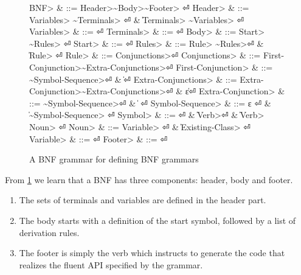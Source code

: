 \begin{figure}
  \begin{Grammar}
    \begin{aligned}
      \<BNF>                & ::= \<Header>\~\<Body>\~\<Footer> \hfill⏎
      \<Header>             & ::= \<Variables> \~\<Terminals> \hfill⏎
      {}                    & \| \<Terminals> \~\<Variables> \hfill⏎
      \<Variables>          & ::= \hfill⏎
      \<Terminals>          & ::= \hfill⏎
      \<Body>               & ::= \<Start> \~\<Rules> \hfill⏎
      \<Start>              & ::=  \hfill⏎
      \<Rules>              & ::= \<Rule> \~\<Rules>\hfill⏎
      {}                    & \| \<Rule> \hfill⏎
      \<Rule>               & ::=  \<Conjunctions>\hfill⏎
      \<Conjunctions>       & ::= \<First-Conjunction>\~\<Extra-Conjunctions>\hfill⏎
      \<First-Conjunction>  & ::= \~\<Symbol-Sequence>\hfill⏎
      {}                    & \| \hfill⏎
      \<Extra-Conjunctions> & ::= \<Extra-Conjunction>\~\<Extra-Conjunctions>\hfill⏎
      {}                    & \| ε\hfill⏎
      \<Extra-Conjunction>  & ::= \~\<Symbol-Sequence>\hfill⏎
      {}                    & \|  \hfill⏎
      \<Symbol-Sequence>    & ::= ε \hfill⏎
      {}                    & \| \~\<Symbol-Sequence> \hfill⏎
      \<Symbol>             & ::=  \hfill⏎
      {}                    & \| \<Verb>\hfill⏎
      {}                    & \| \<Verb>~\cc{,} \<Noun> \hfill⏎
      \<Noun>               & ::= \<Variable> \hfill⏎
      {}                    & \| \<Existing-Class> \hfill⏎
      \<Variable>           & ::=  \hfill⏎
      \<Footer>             & ::= \hfill⏎
    \end{aligned}
  \end{Grammar}
  \caption{A BNF grammar for defining BNF grammars}
  \label{figure:BNF:BNF}
\end{figure}
\begin{comment}
Note that this specification can only be approximate;
the figure uses verbs as replacement to indentation,
and special symbols such as~$|$,~$::-$ and~$ε$.
\end{comment}

From \cref{figure:BNF:BNF} we learn
that a BNF has three components: header, body and footer.
\begin{enumerate}
  \item The sets of terminals and variables are defined in the header part.
  \item The body starts with a definition of the start symbol, followed by a list of derivation
        rules.
  \item The footer is simply the verb  which instructs \Self
        to generate the code that realizes the fluent API specified by the grammar.
\end{enumerate}

